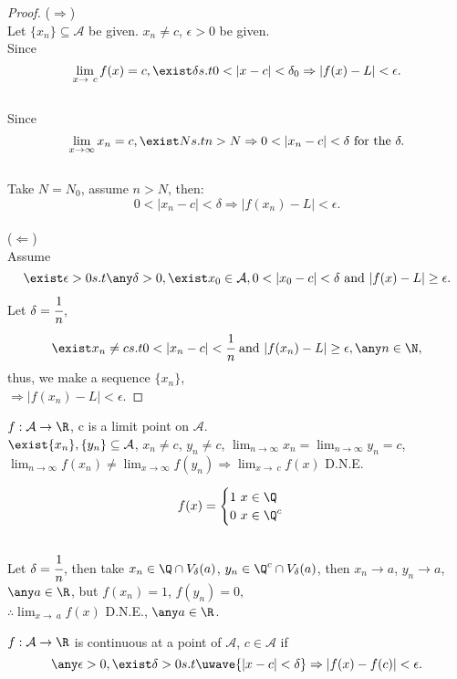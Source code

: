 \begin{proof}
    ($\Rightarrow$) \\
    Let $\{x_n\} \subseteq \mathcal{A}$ be given. $x_n \neq c$, $\epsilon > 0$ be given. \\
    Since 
    \[
    \lim_{x\to\ c} f(x) = c, \exist \delta s.t 0<|x-c|<\delta_0 \Rightarrow |f(x) -L| <\epsilon.
    \] \\
    Since 
    \[
    \lim_{x\to\infty} x_n = c, \exist N  s.t n>N \Rightarrow 0<|x_n -c| <\delta \text{ for the }\delta.
    \] \\
    Take $N = N_0$, assume $n>N$, then:\\
    \[
    0<|x_n-c|<\delta \Rightarrow |f(x_n) -L| <\epsilon.
    \]\\
    ($\Leftarrow$) \\
    Assume \[
    \exist \epsilon > 0 s.t \any \delta >0, \exist x_0 \in \mathcal{A}, 0<|x_0 -c| < \delta \text{ and } |f(x)-L| \geq \epsilon.
    \]
    Let $\delta = \cfrac{1}{n}$, 
    \[
    \exist x_n \neq c s.t 0<|x_n-c|<\cfrac{1}{n} \text{ and } |f(x_n) -L| \geq \epsilon, \any n \in \N,\] 
    thus, we make a sequence $\{x_n\}$,\\
     $\Rightarrow |f(x_n) - L| <\epsilon$.
\end{proof}
\begin{theorem}
\label{Algebraic Limit Theorem}
    $f:\mathcal{A} \rightarrow \R$, c is a limit point on $\mathcal{A}$. \\
    $\exist \{ x_n\}, \{y_n\} \subseteq \mathcal{A}$, $x_n \neq c$, $y_n \neq c$, $\lim_{n\to\infty} x_n = \lim_{n\to\infty} y_n = c$, $\lim_{n\to\infty} f(x_n) \neq \lim_{x\to\infty} f(y_n) \Rightarrow \lim_{x\to\ c} f(x)$ D.N.E.
\end{theorem}
\begin{example}
    \[
        f(x) = 
    \begin{cases}
        \text{1 } x \in \Q \\
        \text{0 } x \in \Q^c
    \end{cases}\] \\
    Let $\delta = \cfrac{1}{n}$, then take $x_n \in \Q \cap V_\delta (a)$, $y_n \in \Q^c \cap V_\delta (a)$, then $x_n \rightarrow a$, $y_n \rightarrow a$, $\any a \in \R$, but $f(x_n) =1$, $f(y_n) = 0,$\\
    $\therefore \lim_{x\to\ a} f(x)$ D.N.E., $\any a \in \R$.
\end{example}
\begin{definition}
    $f:\mathcal{A}\rightarrow\R$ is continuous at a point of $\mathcal{A}$, $c \in \mathcal{A}$ if 
    \[
    \any \epsilon > 0, \exist \delta >0 s.t \uwave{|x-c|<\delta }\Rightarrow |f(x)-f(c)| < \epsilon.
    \]
\end{definition}
